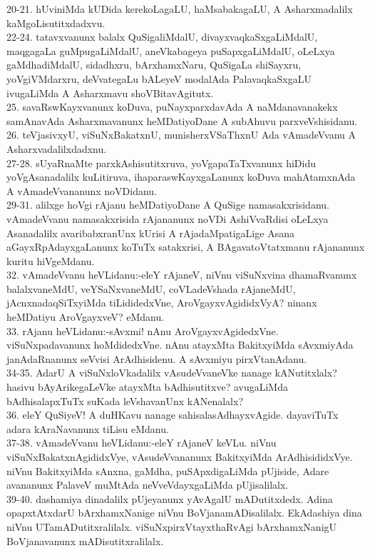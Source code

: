 \documentclass{article}
\begin{document}
20-21. hUviniMda kUDida kerekoLagaLU, haMsabakagaLU, A Asharxmadalilx kaMgoLisutitxdadxvu.\\
22-24. tatavxvanunx balalx QuSigaliMdalU, divayxvaqkaSxgaLiMdalU, maqgagaLa guMpugaLiMdalU, aneVkabageya puSapxgaLiMdalU, oLeLxya gaMdhadiMdalU, sidadhxru, bArxhamxNaru, QuSigaLa shiSayxru, yoVgiVMdarxru, deVvategaLu bALeyeV modalAda PalavaqkaSxgaLU ivugaLiMda A Asharxmavu shoVBitavAgitutx.\\
25. savaRswKayxvanunx koDuva, puNayxparxdavAda A naMdanavanakekx samAnavAda Asharxmavanunx heMDatiyoDane A subAhuvu parxveVshisidanu.\\
26. teVjasivxyU, viSuNxBakatxnU, munisherxVSaThxnU Ada vAmadeVvanu A Asharxvadalilxdadxnu.\\
27-28. sUyaRnaMte parxkAshisutitxruva, yoVgapaTaTxvanunx hiDidu yoVgAsanadalilx kuLitiruva, ihaparaswKayxgaLanunx koDuva mahAtamxnAda A vAmadeVvananunx noVDidanu.\\
29-31. alilxge hoVgi rAjanu heMDatiyoDane A QuSige namasakxrisidanu. vAmadeVvanu namasakxrisida rAjananunx noVDi AshiVvaRdisi oLeLxya Asanadalilx avaribabxranUnx kUrisi A rAjadaMpatigaLige Asana aGayxRpAdayxgaLanunx koTuTx satakxrisi, A BAgavatoVtatxmanu rAjananunx kuritu hiVgeMdanu.\\
32. vAmadeVvanu heVLidanu:-eleY rAjaneV, niVnu viSuNxvina dhamaRvanunx balalxvaneMdU, veYSaNxvaneMdU, coVLadeVshada rAjaneMdU, jAcnxnadaqSiTxyiMda tiLididedxVne, AroVgayxvAgididxVyA? ninanx heMDatiyu AroVgayxveV? eMdanu.\\
33. rAjanu heVLidanu:-sAvxmi! nAnu AroVgayxvAgidedxVne. viSuNxpadavanunx hoMdidedxVne. nAnu atayxMta BakitxyiMda sAvxmiyAda janAdaRnanunx seVvisi ArAdhisidenu. A sAvxmiyu pirxVtanAdanu.\\
34-35. AdarU A viSuNxloVkadalilx vAsudeVvaneVke nanage kANutitxlalx? hasivu bAyArikegaLeVke atayxMta bAdhisutitxve? avugaLiMda bAdhisalapxTuTx suKada leVshavanUnx kANenalalx?\\
36. eleY QuSiyeV! A duHKavu nanage sahisalasAdhayxvAgide. dayaviTuTx adara kAraNavanunx tiLisu eMdanu.\\
37-38. vAmadeVvanu heVLidanu:-eleY rAjaneV keVLu. niVnu viSuNxBakatxnAgididxVye, vAsudeVvananunx BakitxyiMda ArAdhisididxVye. niVnu BakitxyiMda sAnxna, gaMdha, puSApxdigaLiMda pUjiside, Adare avananunx PalaveV muMtAda neVveVdayxgaLiMda pUjisalilalx.\\
39-40. dashamiya dinadalilx pUjeyanunx yAvAgalU mADutitxdedx. Adina opapxtAtxdarU bArxhamxNanige niVnu BoVjanamADisalilalx. EkAdashiya dina niVnu UTamADutitxralilalx. viSuNxpirxVtayxthaRvAgi bArxhamxNanigU BoVjanavanunx mADisutitxralilalx.\\
\end{document}
